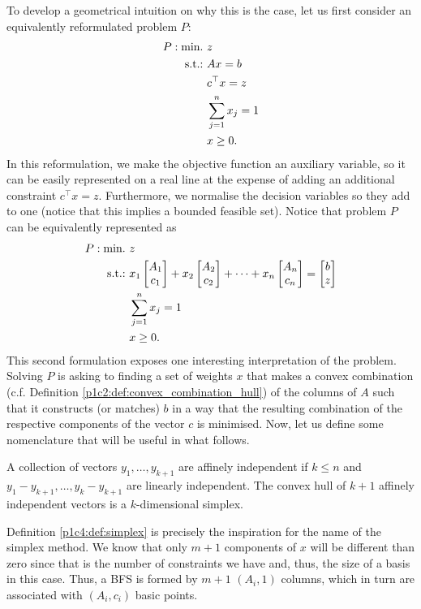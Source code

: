 To develop a geometrical intuition on why this is the case, let us first consider an equivalently reformulated problem $P$:
%
\begin{align*}
	P : \mathop{\text{min.~}} & z           \\
	\mathop{\text{s.t.:~}} & Ax = b        \\
	& c^\top x = z      \\	
	& \sum_{j=1}^nx_j=1 \\
	& x \geq 0.
\end{align*}
% 
In this reformulation, we make the objective function an auxiliary variable, so it can be easily represented on a real line at the expense of adding an additional constraint $c^\top x = z$. Furthermore, we normalise the decision variables so they add to one (notice that this implies a bounded feasible set). Notice that problem $P$ can be equivalently represented as  
%
\begin{align*}
	P : \mathop{\text{min.~}} & z     \\
	\mathop{\text{s.t.:~}} & x_1\begin{bmatrix}
		A_1 \\
		c_1
	\end{bmatrix} + x_2\begin{bmatrix}
		A_2 \\
		c_2
	\end{bmatrix} + \dots +
	x_n\begin{bmatrix}
		A_n \\
		c_n
	\end{bmatrix} = \begin{bmatrix}
		b \\
		z
	\end{bmatrix}\\
	& \sum_{j=1}^nx_j=1 \\
	& x \geq 0.
\end{align*}
% 
This second formulation exposes one interesting interpretation of the problem. Solving $P$ is asking to finding a set of weights $x$ that makes a convex combination (c.f. Definition \ref{p1c2:def:convex_combination_hull}) of the columns of $A$ such that it constructs (or matches) $b$ in a way that the resulting combination of the respective components of the vector $c$ is minimised. Now, let us define some nomenclature that will be useful in what follows.
%
\begin{definition} \label{p1c4:def:simplex}
	A collection of vectors $y_1, \dots, y_{k+1}$ are affinely independent if $k \leq n$ and $y_1 - y_{k+1}, \dots, y_{k} - y_{k+1}$ are linearly independent. The convex hull of $k+1$ affinely independent vectors is a $k$-dimensional simplex.
\end{definition}
%
Definition \ref{p1c4:def:simplex} is precisely the inspiration for the name of the simplex method. We know that only $m+1$ components of $x$ will be different than zero since that is the number of constraints we have and, thus, the size of a basis in this case. Thus, a BFS is formed by $m+1$ $(A_i, 1)$ columns, which in turn are associated with $(A_i,c_i)$ basic points. 

